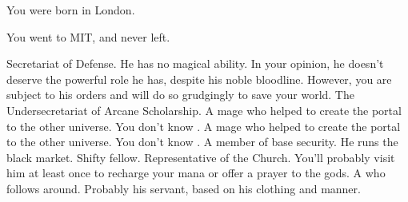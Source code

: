 \documentclass[char]{guildcamp3}
\begin{document}
\begin{itemz}[Notes]
  \item You were born in London.
  \item You went to MIT, and never left.
\end{itemz}


\begin{contacts}
  \contact{\cNobleOne{}} Secretariat of Defense. He has no magical ability. In your opinion, he doesn't deserve the powerful role he has, despite his noble bloodline. However, you are subject to his orders and will do so grudgingly to save your world.
  \contact{\cNobleTwo{}} The Undersecretariat of Arcane Scholarship. 
  \contact{\cMageOne{}} A mage who helped to create the portal to the other universe. You don't know \cMageOne{\them}.
  \contact{\cMageTwo{}} A mage who helped to create the portal to the other universe. You don't know \cMageTwo{\them}.
  \contact{\cRogueTwo{}} A member of base security. He runs the black market. Shifty fellow.
  \contact{\cPaladin{}} Representative of the Church. You'll probably visit him at least once to recharge your mana or offer a prayer to the gods.
  \contact{\cServant{}} A \cServant{\human} who follows \cNobleOne{} around. Probably his servant, based on his clothing and manner. 
\end{contacts}
\end{document}

